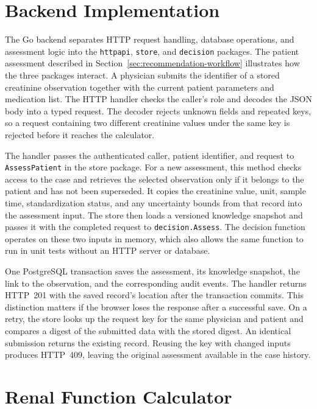 \documentclass[12pt,a4paper,twoside]{book}
\begin{document}
\section{Backend Implementation}
\label{sec:backend-implementation}

The Go backend separates HTTP request handling, database operations, and assessment logic into the \texttt{httpapi}, \texttt{store}, and \texttt{decision} packages.
The patient assessment described in Section~\ref{sec:recommendation-workflow} illustrates how the three packages interact.
A physician submits the identifier of a stored creatinine observation together with the current patient parameters and medication list.
The HTTP handler checks the caller's role and decodes the JSON body into a typed request.
The decoder rejects unknown fields and repeated keys, so a request containing two different creatinine values under the same key is rejected before it reaches the calculator.

The handler passes the authenticated caller, patient identifier, and request to \texttt{AssessPatient} in the store package.
For a new assessment, this method checks access to the case and retrieves the selected observation only if it belongs to the patient and has not been superseded.
It copies the creatinine value, unit, sample time, standardization status, and any uncertainty bounds from that record into the assessment input.
The store then loads a versioned knowledge snapshot and passes it with the completed request to \texttt{decision.Assess}.
The decision function operates on these two inputs in memory, which also allows the same function to run in unit tests without an HTTP server or database.

One PostgreSQL transaction saves the assessment, its knowledge snapshot, the link to the observation, and the corresponding audit events.
The handler returns HTTP~201 with the saved record's location after the transaction commits.
This distinction matters if the browser loses the response after a successful save.
On a retry, the store looks up the request key for the same physician and patient and compares a digest of the submitted data with the stored digest.
An identical submission returns the existing record. Reusing the key with changed inputs produces HTTP~409, leaving the original assessment available in the case history.

\section{Renal Function Calculator}
\label{sec:renal-function-calculator}
\end{document}

